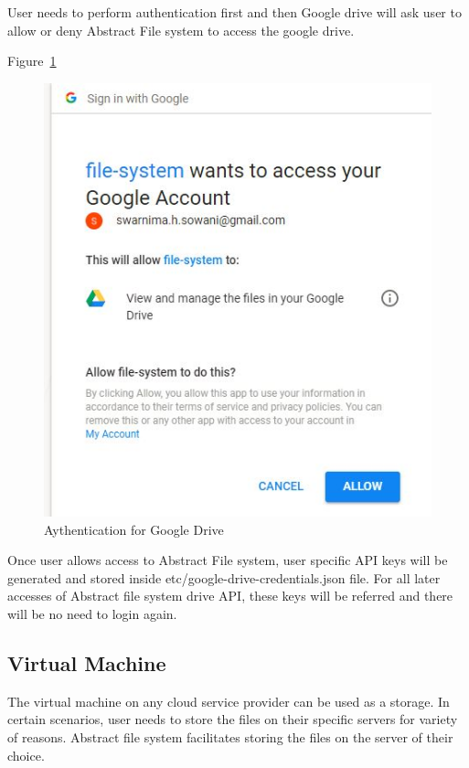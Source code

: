 User needs to perform authentication first and then Google drive will ask user 
to allow or deny Abstract File system to access the google drive. 

Figure~\ref{fig:auth}

\begin{figure}[!ht]
        \centering\includegraphics[width=\columnwidth]
        {image/auth.JPG}
        \caption{Aythentication for Google Drive}\label{fig:auth}
\end{figure}


Once user allows access to Abstract File system, user specific API keys will 
be generated and stored inside etc/google-drive-credentials.json file. 
For all later accesses of Abstract file system drive API, these keys will be 
referred and there will be no need to login again. 


\subsection{Virtual Machine}
The virtual machine on any cloud service provider can be used as a storage. In 
certain scenarios, user needs to store the files on their specific servers for 
variety of reasons. Abstract file system facilitates storing the files on the 
server of their choice.

